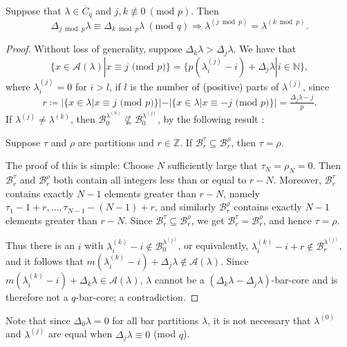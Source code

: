 \documentclass[ALCO, Unicode,published]{cedram}
\begin{document}
\begin{lemm}\label{lem2} 
Suppose that $\lambda\in\overline{C}_q$ and $j,k\not\equiv0\:(\text{mod }p)$. Then 
$$\Delta_{j\bmod p}\lambda\equiv\Delta_{k\bmod p}\lambda\:(\text{mod }q)\Rightarrow\lambda^{(j\bmod p)}=\lambda^{(k\bmod p)}.$$
\end{lemm}
\begin{proof}
Without loss of generality, suppose $\Delta_k\lambda>\Delta_j\lambda$. We have that $$\{x\in\mathcal{A}(\lambda)|x\equiv j\text{ (mod }p)\}=\{p(\lambda^{(j)}_i-i)+\Delta_j\lambda|i\in\mathbb{N}\},$$ where $\lambda^{(j)}_i=0$ for $i>l$, if $l$ is the number of (positive) parts of $\lambda^{(j)}$, since $$r\coloneqq|\{x\in\lambda|x\equiv j\text{ (mod }p)\}|-|\{x\in\lambda|x\equiv-j\text{ (mod }p)\}|=\tfrac{\Delta_j\lambda-j}{p}.$$ If $\lambda^{(j)}\neq\lambda^{(k)}$, then $\mathcal{B}^{\lambda^{(k)}}_0\not\subseteq\mathcal{B}^{\lambda^{(j)}}_0$, by the following result \cite[Lemma 2.1]{F1}: 
\begin{center}Suppose $\tau$ and $\rho$ are partitions and $r\in\mathbb{Z}$. If $\mathcal{B}^\tau_r\subseteq\mathcal{B}^\rho_r$, then $\tau=\rho$. 
\end{center}
The proof of this is simple: Choose $N$ sufficiently large that $\tau_N=\rho_N=0$. Then $\mathcal{B}^\tau_r$ and $\mathcal{B}^\rho_r$ both contain all integers less than or equal to $r-N$. Moreover, $\mathcal{B}^\tau_r$ contains exactly $N-1$ elements greater than $r-N$, namely $\tau_1-1+r,\dots,\tau_{N-1}-(N-1)+r$, and similarly $\mathcal{B}^\rho_r$ contains exactly $N-1$ elements greater than $r-N$. Since $\mathcal{B}^\tau_r\subseteq\mathcal{B}^\rho_r$, we get $\mathcal{B}^\tau_r=\mathcal{B}^\rho_r$, and hence $\tau=\rho$. 

Thus there is an $i$ with $\lambda^{(k)}_i-i\not\in\mathcal{B}^{\lambda^{(j)}}_0$, or equivalently, $\lambda^{(k)}_i-i+r\not\in\mathcal{B}^{\lambda^{(j)}}_r$, and it follows that $m(\lambda^{(k)}_i-i)+\Delta_j\lambda\not\in\mathcal{A}(\lambda)$. Since $m(\lambda^{(k)}_i-i)+\Delta_k\lambda\in\mathcal{A}(\lambda)$, $\lambda$ cannot be a $(\Delta_k\lambda-\Delta_j\lambda)$-bar-core and is therefore not a $q$-bar-core; a contradiction.
\end{proof} 

Note that since $\Delta_0\lambda=0$ for all bar partitions $\lambda$, it is not necessary that $\lambda^{(0)}$ and $\lambda^{(j)}$ are equal when $\Delta_j\lambda\equiv0$ (mod $q$). 
\end{document}
